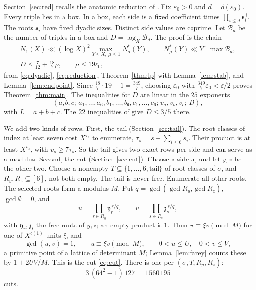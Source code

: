 \documentclass{amsart}
\numberwithin{equation}{section}
\numberwithin{table}{section}
\begin{document}
Section~\ref{sec:red} recalls the anatomic reduction of \cite{BLT,Be,BBLT}.
Fix $\varepsilon_0>0$ and $d=d(\varepsilon_0)$. Every triple lies in a box.
In a box, each side is a fixed coefficient times
$\prod_{i\le d}\mathfrak s_i^{\,i}$. The roots $\mathfrak s_i$ have fixed
dyadic sizes. Distinct side values are coprime. Let $\mathcal B_d$ be the number of triples in a
box and $D=\log_X\mathcal B_d$. The proof is the chain
\[
 \begin{gathered}
 N_1(X)\ll(\log X)^2\max_{Y\le X,\ \mu\le1}N^*_\mu(Y),\qquad
 N^*_\mu(Y)\ll Y^{\varepsilon_0}\max\mathcal B_d,\\
 D\le\frac7{12}+\frac{18}{7}\rho,\qquad \rho\le19\varepsilon_0,
 \end{gathered}
\]
from \eqref{eq:dyadic}, \eqref{eq:reduction}, Theorem~\ref{thm:lp} with
Lemma~\ref{lem:stab}, and Lemma~\ref{lem:endpoint}. Since
$\tfrac{18}{7}\cdot19+1=\tfrac{349}{7}$, choosing $\varepsilon_0$ with
$\tfrac{349}{7}\varepsilon_0<\varepsilon/2$ proves Theorem~\ref{thm:main}. The inequalities for $D$ are linear in the $25$
exponents
\begin{equation}\label{eq:vars}
 (a,b,c;\,a_1,\dots,a_6,b_1,\dots,b_6,c_1,\dots,c_6;\,v_a,v_b,v_c;\,D),
\end{equation}
with $L=a+b+c$. The $22$ inequalities of \cite[Proposition~6.1]{BBLT} give
$D\le3/5$ there.

We add two kinds of rows. First, the tail (Section~\ref{sec:tail}). The
root classes of index at least seven cost $X^{\tau_s}$ to enumerate,
$\tau_s=s-\sum_{i\le6}s_i$. Their product is at least $X^{v_s}$, with
$v_s\ge7\tau_s$. So the tail
gives two exact rows per side and can serve as a modulus. Second, the cut
(Section~\ref{sec:cut}). Choose a side $\sigma$, and let $y,z$ be the other
two. Choose a nonempty $T\subseteq\{1,\ldots,6,\mathrm{tail}\}$ of root
classes of $\sigma$, and $R_y,R_z\subseteq[6]$, not both empty. The tail is
never free. Enumerate all other roots. The selected roots form a modulus
$M$. Put $q=\gcd(\gcd R_y,\gcd R_z)$, $\gcd\emptyset=0$, and
\[
 u=\prod_{r\in R_y}\mathfrak y_r^{\,r/q},\qquad v=\prod_{s\in R_z}\mathfrak z_s^{\,s/q},
\]
with $\mathfrak y_r,\mathfrak z_s$ the free roots of $y,z$; an empty product
is $1$. Then $u\equiv\xi v\pmod M$ for one of $X^{o(1)}$ units $\xi$, and
\[
 \gcd(u,v)=1,\qquad u\equiv\xi v\pmod M,\qquad 0<u\le U,\quad 0<v\le V,
\]
a primitive point of a lattice of determinant $M$; Lemma~\ref{lem:farey}
counts these by $1+2UV/M$. This is the cut \eqref{eq:cut}. There is one per
$(\sigma,T,R_y,R_z)$:
\begin{equation}\label{eq:cutcount}
 3\,(64^2-1)\,127=1\,560\,195
\end{equation}
cuts.
\end{document}
